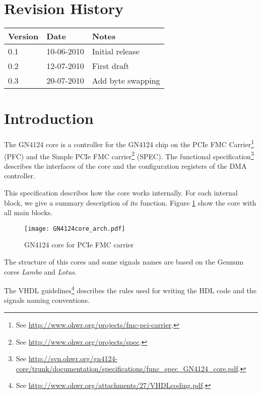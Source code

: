 \documentclass[10pt,a4paper]{cerndoc}
\begin{document}
  \cerntitle
 \section*{Revision History}
  \begin{tabularx}{\textwidth}{|p{3cm}|p{3cm}|X|}
    \hline \textbf{Version}&\textbf{Date}&\textbf{Notes}\\ \hline \hline
    0.1 & 10-06-2010 & Initial release\\ \hline
    0.2 & 12-07-2010 & First draft\\ \hline
    0.3 & 20-07-2010 & Add byte swapping\\ \hline
  \end{tabularx}

  \tableofcontents
  \listoffigures
  \clearpage

 \section*{Introduction}
  The GN4124 core is a controller for the GN4124 chip on the PCIe FMC Carrier\footnote{See \href{http://www.ohwr.org/projects/fmc-pci-carrier}{http://www.ohwr.org/projects/fmc-pci-carrier}.} (PFC) and the Simple PCIe FMC carrier\footnote{See \href{http://www.ohwr.org/projects/spec}{http://www.ohwr.org/projects/spec}.} (SPEC).
  The functional specification\footnote{See \href{http://svn.ohwr.org/gn4124-core/trunk/documentation/specifications/func_spec_GN4124_core.pdf}{http://svn.ohwr.org/gn4124-core/trunk/documentation/specifications/func\_spec\_GN4124\_core.pdf}.} describes the interfaces of the core and the configuration registers of the DMA controller.

  This specification describes how the core works internally. For each internal block, we give a summary description of its function. Figure \ref{fig:GN4124core_arch} show the core with all main blocks.

  \begin{figure}[!ht]
   \centering
   \texttt{[image: GN4124core\_arch.pdf]}
   \caption{GN4124 core for PCIe FMC carrier}
   \label{fig:GN4124core_arch}
  \end{figure}

  The structure of this cores and some signals names are based on the Gennum cores \emph{Lambo} and \emph{Lotus}.

  The VHDL guidelines\footnote{See \href{http://www.ohwr.org/attachments/27/VHDLcoding.pdf}{http://www.ohwr.org/attachments/27/VHDLcoding.pdf}.} describes the rules used for writing the HDL code and the signals naming conventions.
\end{document}
